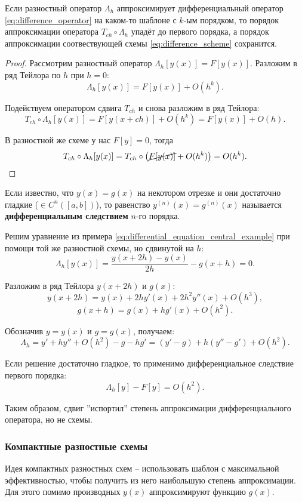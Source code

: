 \documentclass[../main.tex]{subfile}
\begin{document}
\begin{theorem}
	Если разностный оператор $\Lambda_h$ аппроксимирует дифференциальный
	оператор \eqref{eq:difference_operator} на каком-то шаблоне с $k$-ым
	порядком, то порядок аппроксимации оператора $T_{ch}\circ\Lambda_h$
	упадёт до первого порядка, а порядок аппроксимации соотвествующей
	схемы \eqref{eq:difference_scheme} сохранится.
\end{theorem}

\begin{proof}
	Рассмотрим разностный оператор $\Lambda_h[y(x)]=F[y(x)]$.
	Разложим в ряд Тейлора по $h$ при $h=0$:
	\[\Lambda_h[y(x)]=F[y(x)]+O(h^k).\]

	Подействуем оператором сдвига $T_{ch}$ и снова разложим в ряд Тейлора:
	\[T_{ch}\circ\Lambda_h[y(x)]=F[y(x+ch)]+O(h^k)=F[y(x)]+O(h).\]

	В разностной же схеме у нас $F[y]=0$, тогда
	\[T_{ch}\circ\Lambda_h[y(x)]=T_{ch}\circ\big(\cancel{F[y(x)]}+O(h^k)
	\big)=O(h^k).\]
\end{proof}

\begin{define}
	Если известно, что $y(x)=g(x)$ на некотором отрезке и они достаточно
	гладкие ($\in C^n([a,b])$), то равенство $y^{(n)}(x)=g^{(n)}(x)$
	называется \textbf{дифференциальным следствием} $n$-го порядка.
\end{define}

\begin{example}\label{eq:differential_equation_shift_example}
	Решим уравнение из примера
	\eqref{eq:differential_equation_central_example} при помощи той же
	разностной схемы, но сдвинутой на $h$:
	\[\Lambda_h[y(x)]=\frac{y(x+2h)-y(x)}{2h}-g(x+h)=0.\]

	Разложим в ряд Тейлора $y(x+2h)$ и $g(x)$:
	\[y(x+2h)=y(x)+2hy'(x)+2h^2y''(x)+O(h^3),\]
	\[g(x+h)=g(x)+hg'(x)+O(h^2).\]

	Обозначив $y=y(x)$ и $g=g(x)$, получаем:
	\[\Lambda_h=y'+hy''+O(h^2)-g-hg'=
	(y'-g)+h(y''-g')+O(h^2).\]

	Если решение достаточно гладкое, то применимо дифференциальное
	следствие первого порядка:
	\[\Lambda_h[y]-F[y]=O(h^2).\]

	Таким образом, сдвиг ''испортил'' степень аппроксимации
	дифференциального оператора, но не схемы.
\end{example}
\newpage

\subsubsection{Компактные разностные схемы}
Идея компактных разностных схем -- использовать шаблон с максимальной
эффективностью, чтобы получить из него наибольшую степень аппроксимации. Для
этого помимо производных $y(x)$ аппроксимируют функцию $g(x)$.
\end{document}
